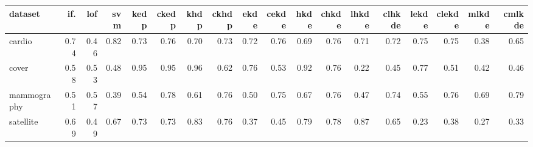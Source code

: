 \begin{table}[ht]
\centering
\begin{tabular}{lrrrrrrrrrrrrrrrrr}
  \hline
dataset & if. & lof & svm & kedp & ckedp & khdp & ckhdp & ekde & cekde & hkde & chkde & lhkde & clhkde & lekde & clekde & mlkde & cmlkde \\ 
  \hline
cardio & 0.74 & 0.46 & 0.82 & 0.73 & 0.76 & 0.70 & 0.73 & 0.72 & 0.76 & 0.69 & 0.76 & 0.71 & 0.72 & 0.75 & 0.75 & 0.38 & 0.65 \\ 
  cover & 0.58 & 0.53 & 0.48 & 0.95 & 0.95 & 0.96 & 0.62 & 0.76 & 0.53 & 0.92 & 0.76 & 0.22 & 0.45 & 0.77 & 0.51 & 0.42 & 0.46 \\ 
  mammography & 0.51 & 0.57 & 0.39 & 0.54 & 0.78 & 0.61 & 0.76 & 0.50 & 0.75 & 0.67 & 0.76 & 0.47 & 0.74 & 0.55 & 0.76 & 0.69 & 0.79 \\ 
  satellite & 0.69 & 0.49 & 0.67 & 0.73 & 0.73 & 0.83 & 0.76 & 0.37 & 0.45 & 0.79 & 0.78 & 0.87 & 0.65 & 0.23 & 0.38 & 0.27 & 0.33 \\ 
   \hline
\end{tabular}
\end{table}
